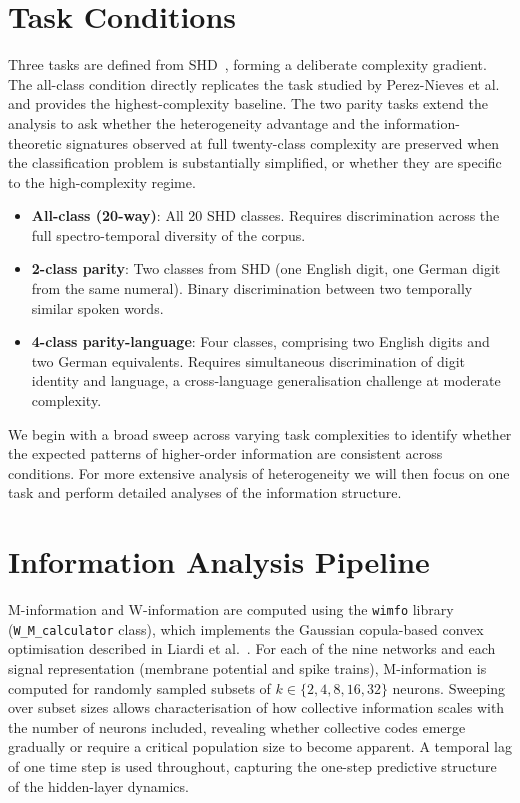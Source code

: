\documentclass[12pt,twoside]{report}
\begin{document}
\section{Task Conditions}

Three tasks are defined from SHD~\cite{cramer2022}, forming a deliberate complexity 
gradient. The all-class condition directly replicates the task studied by 
Perez-Nieves et al.~\cite{pereznieves2021} and provides the highest-complexity 
baseline. The two parity tasks extend the analysis to ask whether the heterogeneity 
advantage and the information-theoretic signatures observed at full twenty-class 
complexity are preserved when the classification problem is substantially simplified, 
or whether they are specific to the high-complexity regime.

\begin{itemize}
    \item \textbf{All-class (20-way)}: All 20 SHD classes. Requires 
    discrimination across the full spectro-temporal diversity of the corpus.

    \item \textbf{2-class parity}: Two classes from SHD (one English digit, 
    one German digit from the same numeral). Binary discrimination between two 
    temporally similar spoken words.

    \item \textbf{4-class parity-language}: Four classes, comprising two English
    digits and two German equivalents. Requires simultaneous discrimination of 
    digit identity and language, a cross-language generalisation challenge at 
    moderate complexity.
\end{itemize}

We begin with a broad sweep across varying task complexities to identify whether the expected patterns of higher-order information
are consistent across conditions. For more extensive analysis of heterogeneity we will then focus on one
task and perform detailed analyses of the information structure.

\section{Information Analysis Pipeline}

M-information and W-information are computed using the \texttt{wimfo} library 
(\texttt{W\_M\_calculator} class), which implements the Gaussian copula-based 
convex optimisation described in Liardi et al.~\cite{liardiscalable}. For each 
of the nine networks and each signal representation (membrane potential and 
spike trains), M-information is computed for randomly sampled subsets of 
$k \in \{2, 4, 8, 16, 32\}$ neurons. Sweeping over subset sizes allows 
characterisation of how collective information scales with the number of neurons 
included, revealing whether collective codes emerge gradually or require a 
critical population size to become apparent. A temporal lag of one time step 
is used throughout, capturing the one-step predictive structure of the 
hidden-layer dynamics.
\end{document}
